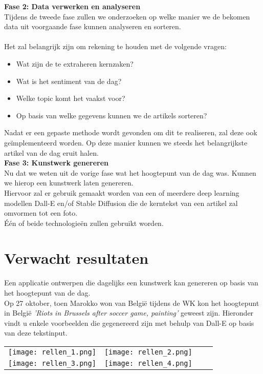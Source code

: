 \noindent
\textbf{Fase 2: Data verwerken en analyseren} \\
Tijdens de tweede fase zullen we onderzoeken op welke manier we de bekomen data uit voorgaande fase kunnen analyseren en sorteren. \\ \\
\noindent
Het zal belangrijk zijn om rekening te houden met de volgende vragen: 
\begin{itemize}
    \item Wat zijn de te extraheren kernzaken?
    \item Wat is het sentiment van de dag? 
    \item Welke topic komt het vaakst voor?
    \item Op basis van welke gegevens kunnen we de artikels sorteren? 
\end{itemize}

\noindent
Nadat er een gepaste methode wordt gevonden om dit te realiseren, zal deze ook geïmplementeerd worden. Op deze manier kunnen we steeds het belangrijkste artikel van de dag eruit halen. \\

\noindent
\textbf{Fase 3: Kunstwerk genereren} \\
Nu dat we weten uit de vorige fase wat het hoogtepunt van de dag was. Kunnen we hierop een kunstwerk laten genereren. \\
Hiervoor zal er gebruik gemaakt worden van een of meerdere deep learning modellen Dall-E en/of Stable Diffusion die de kerntekst van een artikel zal omvormen tot een foto. \\

\noindent
Één of beide technologieën zullen gebruikt worden. 



\section{Verwacht resultaten}%
\label{sec:verwachte_resultaten}
\noindent
Een applicatie ontwerpen die dagelijks een kunstwerk kan genereren op basis van het hoogtepunt van de dag. \\

\noindent
Op 27 oktober, toen Marokko won van België tijdens de WK kon het hoogtepunt in België \emph{'Riots in Brussels after soccer game, painting'} geweest zijn. Hieronder vindt u enkele voorbeelden die gegenereerd zijn met behulp van Dall-E op basis van deze tekstinput.


\noindent
\begin{tabular}{llll}
   \texttt{[image: rellen\_1.png]} &
   \texttt{[image: rellen\_2.png]} \\
   \texttt{[image: rellen\_3.png]} &
   \texttt{[image: rellen\_4.png]}
\end{tabular}


